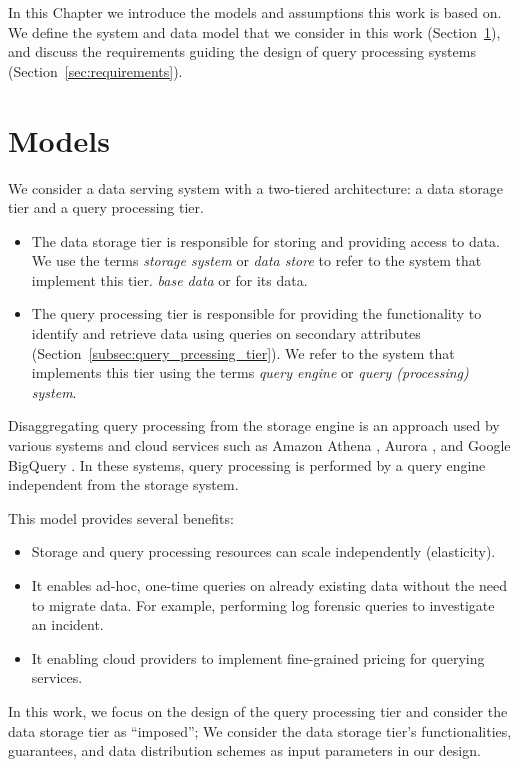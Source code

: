 In this Chapter we introduce the models and assumptions this work is based on.
We define the system and data model that we consider in this work (Section~\ref{sec:models}),
and discuss the requirements guiding the design of query processing systems (Section~\ref{sec:requirements}).

\section{Models}
\label{sec:models}
We consider a data serving system with a two-tiered architecture: a data storage tier and a query processing tier.

\begin{itemize}
  \item The data storage tier is responsible for storing and providing access to data.
  We use the terms \textit{storage system} or \textit{data store} to refer to the system that implement this tier.
  \textit{base data} or  for its data.

  \item The query processing tier is responsible for providing the functionality to identify and retrieve data using
  queries on secondary attributes (Section~\ref{subsec:query_prcessing_tier}).
  We refer to the system that implements this tier using the terms \textit{query engine} or \textit{query (processing) system}.
\end{itemize}

Disaggregating query processing from the storage engine is an approach used by various systems and cloud
services such as Amazon Athena \cite{aws:athena}, Aurora \cite{aws:aurora}, and Google BigQuery
\cite{google:bigquery}.
In these systems, query processing is performed by a query engine independent from the storage system.

This model provides several benefits:
\begin{itemize}
  \item Storage and query processing resources can scale independently (elasticity).
  \item It enables ad-hoc, one-time queries on already existing data without the need to migrate data.
  For example, performing log forensic queries to investigate an incident.
  \item It enabling cloud providers to implement fine-grained pricing for querying services.
\end{itemize}

In this work, we focus on the design of the query processing tier and consider the data storage tier as ``imposed'';
We consider the data storage tier's functionalities, guarantees, and data distribution schemes as input parameters in
our design.

